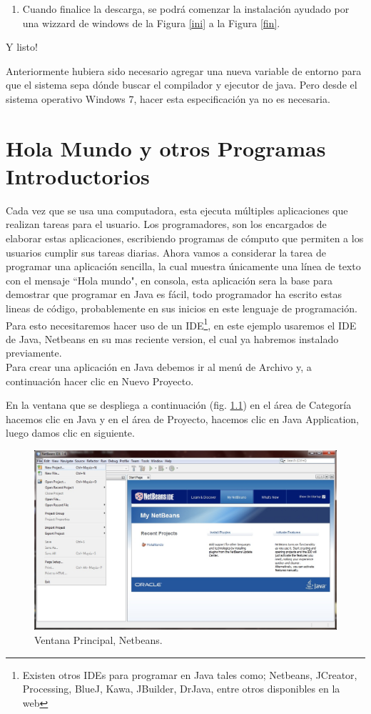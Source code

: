 \documentclass[12pt]{book} %
\begin{document}
\begin{enumerate}
\item Cuando finalice la descarga, se podrá comenzar la instalación ayudado por una wizzard de windows de la Figura \ref{ini} a la Figura \ref{fin}.

	


\end{enumerate}
Y listo!

Anteriormente hubiera sido necesario agregar una nueva variable de entorno para que el sistema sepa dónde buscar el compilador y ejecutor de java. Pero desde el sistema operativo Windows 7, hacer esta especificación ya no es necesaria.


\chapter{Hola Mundo y otros Programas Introductorios}

Cada vez que se usa una computadora, esta ejecuta múltiples aplicaciones que realizan tareas para el usuario. Los programadores, son los encargados de elaborar estas aplicaciones, escribiendo programas de cómputo que permiten a los usuarios cumplir sus tareas diarias.
Ahora vamos a considerar la tarea de programar una aplicación sencilla, la cual muestra únicamente una línea de texto con el mensaje ``Hola mundo", en consola, esta aplicación sera la base para demostrar que programar en Java es fácil, todo programador ha escrito estas lineas de código, probablemente en sus inicios en este lenguaje de programación.
Para esto necesitaremos hacer uso de un IDE\footnote{Existen otros IDEs para programar en Java tales como; Netbeans, JCreator, Processing, BlueJ, Kawa, JBuilder, DrJava, entre otros disponibles en la web}, en este ejemplo usaremos el IDE de Java, Netbeans en su mas reciente version, el cual ya habremos instalado previamente. \\Para crear una aplicación en Java debemos ir al menú de Archivo y, a continuación hacer clic en Nuevo Proyecto.

En la ventana que se despliega a continuación (fig. \ref{hw01}) en el área de Categoría hacemos clic en Java y en el área de Proyecto, hacemos clic en Java Application, luego damos clic en siguiente.

	\begin{figure}[h]
		\centering
			\includegraphics[width=16cm]{Hola_mundo_001.jpg}
			\caption{Ventana Principal, Netbeans.}
			\label{hw01}
	\end{figure}
\end{document}

